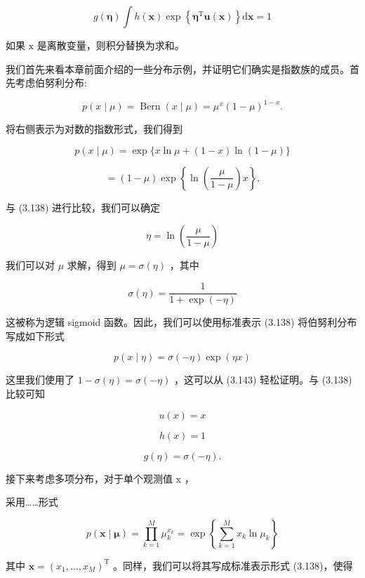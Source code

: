 \documentclass[10pt]{report}
\begin{document}
\[
g\left( \mathbf{\eta }\right) \int h\left( \mathbf{x}\right) \exp \left\{  {{\mathbf{\eta }}^{\mathrm{T}}\mathbf{u}\left( \mathbf{x}\right) }\right\}  \mathrm{d}\mathbf{x} = 1 \tag{3.139}
\]

如果 \(\mathrm{x}\) 是离散变量，则积分替换为求和。

我们首先来看本章前面介绍的一些分布示例，并证明它们确实是指数族的成员。首先考虑伯努利分布:

\[
p\left( {x \mid  \mu }\right)  = \operatorname{Bern}\left( {x \mid  \mu }\right)  = {\mu }^{x}{\left( 1 - \mu \right) }^{1 - x}. \tag{3.140}
\]

将右侧表示为对数的指数形式，我们得到

\[
p\left( {x \mid  \mu }\right)  = \exp \{ x\ln \mu  + \left( {1 - x}\right) \ln \left( {1 - \mu }\right) \}
\]

\[
= \left( {1 - \mu }\right) \exp \left\{  {\ln \left( \frac{\mu }{1 - \mu }\right) x}\right\}  . \tag{3.141}
\]

与 (3.138) 进行比较，我们可以确定

\[
\eta  = \ln \left( \frac{\mu }{1 - \mu }\right)  \tag{3.142}
\]

我们可以对 \(\mu\) 求解，得到 \(\mu  = \sigma \left( \eta \right)\) ，其中

\[
\sigma \left( \eta \right)  = \frac{1}{1 + \exp \left( {-\eta }\right) } \tag{3.143}
\]

这被称为逻辑 sigmoid 函数。因此，我们可以使用标准表示 (3.138) 将伯努利分布写成如下形式

\[
p\left( {x \mid  \eta }\right)  = \sigma \left( {-\eta }\right) \exp \left( {\eta x}\right)  \tag{3.144}
\]

这里我们使用了 \(1 - \sigma \left( \eta \right)  = \sigma \left( {-\eta }\right)\) ，这可以从 (3.143) 轻松证明。与 (3.138) 比较可知

\[
u\left( x\right)  = x \tag{3.145}
\]

\[
h\left( x\right)  = 1 \tag{3.146}
\]

\[
g\left( \eta \right)  = \sigma \left( {-\eta }\right) . \tag{3.147}
\]

接下来考虑多项分布，对于单个观测值 \(\mathrm{x}\) ，

采用……形式

\[
p\left( {\mathbf{x} \mid  \mathbf{\mu }}\right)  = \mathop{\prod }\limits_{{k = 1}}^{M}{\mu }_{k}^{{x}_{k}} = \exp \left\{  {\mathop{\sum }\limits_{{k = 1}}^{M}{x}_{k}\ln {\mu }_{k}}\right\}   \tag{3.148}
\]

其中 \(\mathbf{x} = {\left( {x}_{1},\ldots ,{x}_{M}\right) }^{\mathrm{T}}\) 。同样，我们可以将其写成标准表示形式 (3.138)，使得
\end{document}

